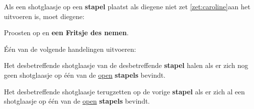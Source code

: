 \vervolgLijst{}
\item Als \eenSpeler een shotglaasje op een \textbf{stapel} plaatst als diegene niet zet \ref{zet:caroline}\footnotemark[1] aan het uitvoeren is, moet diegene:
\puntLijst{}
\item Proosten op  en \textbf{een Fritsje des nemen}\footnotemark[3].
\item Één van de volgende handelingen uitvoeren:
\numeriekeLijst{}
\item Het desbetreffende shotglaasje van de desbetreffende \textbf{stapel} halen als er zich nog geen shotglaasje op \'e\'en van de \ul{open} \textbf{stapels} bevindt.
\item Het desbetreffende shotglaasje terugzetten op de vorige \textbf{stapel} als er zich al een shotglaasje op \'e\'en van de \ul{open} \textbf{stapels} bevindt.
\eindNumeriekeLijst{}
\eindPuntLijst{}
\eindLijst{}

